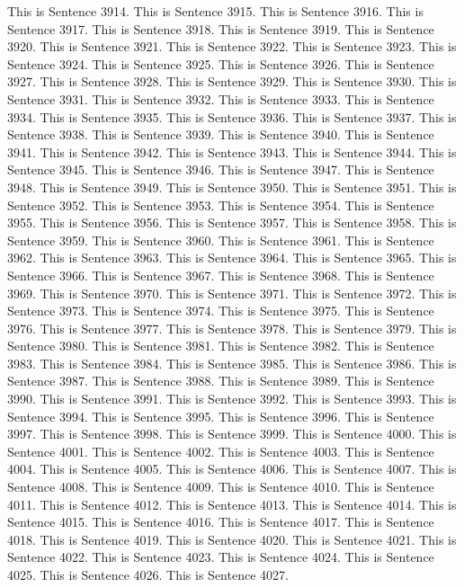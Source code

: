 \documentclass{article}
\begin{document}
This is Sentence 3914.
This is Sentence 3915.
This is Sentence 3916.
This is Sentence 3917.
This is Sentence 3918.
This is Sentence 3919.
This is Sentence 3920.
This is Sentence 3921.
This is Sentence 3922.
This is Sentence 3923.
This is Sentence 3924.
This is Sentence 3925.
This is Sentence 3926.
This is Sentence 3927.
This is Sentence 3928.
This is Sentence 3929.
This is Sentence 3930.
This is Sentence 3931.
This is Sentence 3932.
This is Sentence 3933.
This is Sentence 3934.
This is Sentence 3935.
This is Sentence 3936.
This is Sentence 3937.
This is Sentence 3938.
This is Sentence 3939.
This is Sentence 3940.
This is Sentence 3941.
This is Sentence 3942.
This is Sentence 3943.
This is Sentence 3944.
This is Sentence 3945.
This is Sentence 3946.
This is Sentence 3947.
This is Sentence 3948.
This is Sentence 3949.
This is Sentence 3950.
This is Sentence 3951.
This is Sentence 3952.
This is Sentence 3953.
This is Sentence 3954.
This is Sentence 3955.
This is Sentence 3956.
This is Sentence 3957.
This is Sentence 3958.
This is Sentence 3959.
This is Sentence 3960.
This is Sentence 3961.
This is Sentence 3962.
This is Sentence 3963.
This is Sentence 3964.
This is Sentence 3965.
This is Sentence 3966.
This is Sentence 3967.
This is Sentence 3968.
This is Sentence 3969.
This is Sentence 3970.
This is Sentence 3971.
This is Sentence 3972.
This is Sentence 3973.
This is Sentence 3974.
This is Sentence 3975.
This is Sentence 3976.
This is Sentence 3977.
This is Sentence 3978.
This is Sentence 3979.
This is Sentence 3980.
This is Sentence 3981.
This is Sentence 3982.
This is Sentence 3983.
This is Sentence 3984.
This is Sentence 3985.
This is Sentence 3986.
This is Sentence 3987.
This is Sentence 3988.
This is Sentence 3989.
This is Sentence 3990.
This is Sentence 3991.
This is Sentence 3992.
This is Sentence 3993.
This is Sentence 3994.
This is Sentence 3995.
This is Sentence 3996.
This is Sentence 3997.
This is Sentence 3998.
This is Sentence 3999.
This is Sentence 4000.
This is Sentence 4001.
This is Sentence 4002.
This is Sentence 4003.
This is Sentence 4004.
This is Sentence 4005.
This is Sentence 4006.
This is Sentence 4007.
This is Sentence 4008.
This is Sentence 4009.
This is Sentence 4010.
This is Sentence 4011.
This is Sentence 4012.
This is Sentence 4013.
This is Sentence 4014.
This is Sentence 4015.
This is Sentence 4016.
This is Sentence 4017.
This is Sentence 4018.
This is Sentence 4019.
This is Sentence 4020.
This is Sentence 4021.
This is Sentence 4022.
This is Sentence 4023.
This is Sentence 4024.
This is Sentence 4025.
This is Sentence 4026.
This is Sentence 4027.
\end{document}
